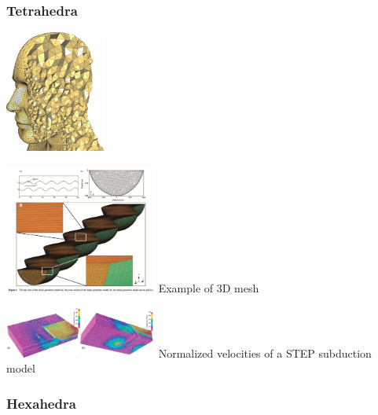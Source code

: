 \Literature \cite{musd15} 






\subsubsection{Tetrahedra}

\begin{center}
\includegraphics[height=4cm]{images/meshes/tetra.png}\\
\end{center}

\begin{center}
\includegraphics[width=5cm]{images/meshes/glacier}
{\small Example of 3D mesh \cite{yash15}  }
\end{center}

\begin{center}
\includegraphics[width=5cm]{images/meshes/gowo05}
{\small Normalized velocities of a STEP subduction model \cite{gowo05}  }
\end{center}


\subsubsection{Hexahedra}

